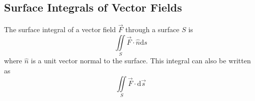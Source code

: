 \subsection{Surface Integrals of Vector Fields}
\begin{definition}
	The surface integral of a vector field $\vec{F}$ through a surface $S$ is 
	\begin{equation*}
		\iint\limits_{S}{\vec{F} \cdot \hat{n}\mathrm{d}s}
	\end{equation*}
	where $\hat{n}$ is a unit vector normal to the surface.
	This integral can also be written as 
	\begin{equation*}
		\iint\limits_{S}{\vec{F} \cdot \mathrm{d}\vec{s}}
	\end{equation*}
\end{definition}


